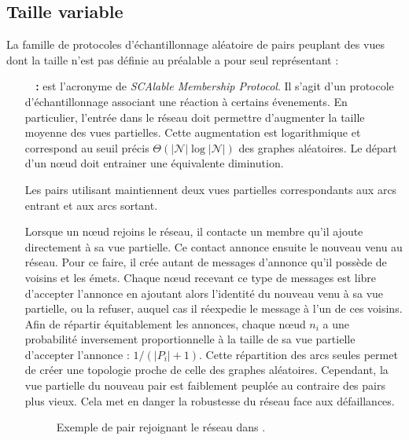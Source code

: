 

\subsection{Taille variable}
\label{net:subsec:variable}

La famille de protocoles d'échantillonnage aléatoire de pairs peuplant des vues
dont la taille n'est pas définie au préalable a pour seul représentant :

\begin{itemize}
\item [\textbf{\SCAMP~\cite{ganesh2001scamp, ganesh2003peer} :}] est l'acronyme
  de \emph{SCAlable Membership Protocol}. Il s'agit d'un protocole
  d'échantillonnage associant une réaction à certains évenements. En
  particulier, l'entrée dans le réseau doit permettre d'augmenter la taille
  moyenne des vues partielles. Cette augmentation est logarithmique et
  correspond au seuil précis $\Theta (|\mathcal{N}|\log |\mathcal{N}|)$ des
  graphes aléatoires. Le départ d'un nœud doit entrainer une équivalente
  diminution.

  Les pairs utilisant \SCAMP maintiennent deux vues partielles correspondants
  aux arcs entrant et aux arcs sortant.

  Lorsque un nœud rejoins le réseau, il contacte un membre qu'il ajoute
  directement à sa vue partielle. Ce contact annonce ensuite le nouveau venu au
  réseau. Pour ce faire, il crée autant de messages d'annonce qu'il possède de
  voisins et les émets. Chaque nœud recevant ce type de messages est libre
  d'accepter l'annonce en ajoutant alors l'identité du nouveau venu à sa vue
  partielle, ou la refuser, auquel cas il réexpedie le message à l'un de ces
  voisins. Afin de répartir équitablement les annonces, chaque nœud $n_i$ a une
  probabilité inversement proportionnelle à la taille de sa vue partielle
  d'accepter l'annonce : $1/(|P_i|+1)$. Cette répartition des arcs seules permet
  de créer une topologie proche de celle des graphes aléatoires. Cependant, la
  vue partielle du nouveau pair est faiblement peuplée au contraire des pairs
  plus vieux. Cela met en danger la robustesse du réseau face aux défaillances.

  \begin{figure}
    \centering
    
    \caption{\label{net:fig:scampexample} Exemple de pair rejoignant le réseau
      dans \SCAMP.}
  \end{figure}


\end{itemize}

